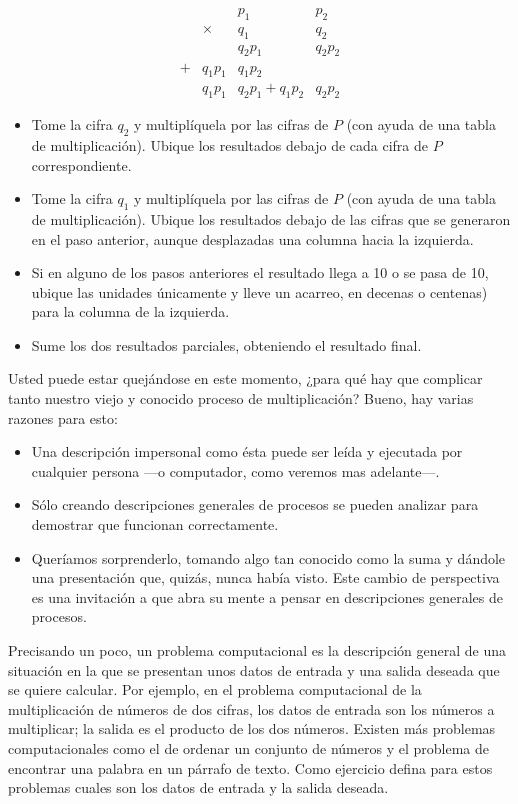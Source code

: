 \[
\begin{array}{cccc}
\  & \  & p_{1} & p_{2}\\
\  & \times & q_{1} & q_{2}\\
\hline \  & \  & q_{2}p_{1} & q_{2}p_{2}\\
+ & q_{1}p_{1} & q_{1}p_{2} & \ \\
\hline \  & q_{1}p_{1} & q_{2}p_{1}+q_{1}p_{2} & q_{2}p_{2}
\end{array}
\]
\begin{itemize}
\item Tome la cifra $q_{2}$ y multiplíquela por las cifras de $P$ (con
ayuda de una tabla de multiplicación). Ubique los resultados debajo
de cada cifra de $P$ correspondiente.
\item Tome la cifra $q_{1}$ y multiplíquela por las cifras de $P$ (con
ayuda de una tabla de multiplicación). Ubique los resultados debajo
de las cifras que se generaron en el paso anterior, aunque desplazadas
una columna hacia la izquierda.
\item Si en alguno de los pasos anteriores el resultado llega a 10 o se
pasa de 10, ubique las unidades únicamente y lleve un acarreo, en
decenas o centenas) para la columna de la izquierda.
\item Sume los dos resultados parciales, obteniendo el resultado final.
\end{itemize}
Usted puede estar quejándose en este momento, ¿para qué hay que complicar
tanto nuestro viejo y conocido proceso de multiplicación? Bueno, hay
varias razones para esto:
\begin{itemize}
\item Una descripción impersonal como ésta puede ser leída y ejecutada por
cualquier persona —o computador, como veremos mas adelante—.
\item Sólo creando descripciones generales de procesos se pueden analizar
para demostrar que funcionan correctamente.
\item Queríamos sorprenderlo, tomando algo tan conocido como la suma y dándole
una presentación que, quizás, nunca había visto. Este cambio de perspectiva
es una invitación a que abra su mente a pensar en descripciones generales
de procesos. 
\end{itemize}
Precisando un poco, un problema computacional es la descripción general
de una situación en la que se presentan unos datos de entrada y una
salida deseada que se quiere calcular. Por ejemplo, en el problema
computacional de la multiplicación de números de dos cifras, los datos
de entrada son los números a multiplicar; la salida es el producto
de los dos números. Existen más problemas computacionales como el
de ordenar un conjunto de números y el problema de encontrar una palabra
en un párrafo de texto. Como ejercicio defina para estos problemas
cuales son los datos de entrada y la salida deseada.

